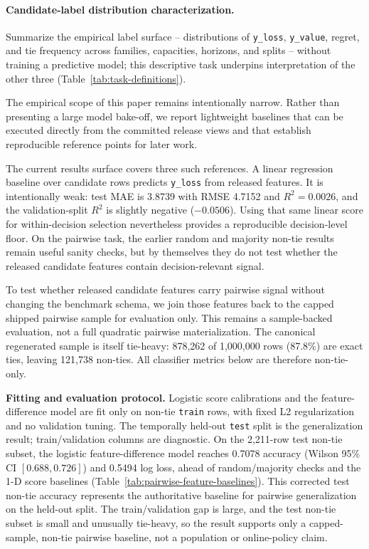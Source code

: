 \paragraph{Candidate-label distribution characterization.}
Summarize the empirical label surface -- distributions of \texttt{y\_loss}, \texttt{y\_value}, regret, and tie frequency across families, capacities, horizons, and splits -- without training a predictive model; this descriptive task underpins interpretation of the other three (Table~\ref{tab:task-definitions}).

The empirical scope of this paper remains intentionally narrow. Rather than presenting a large model bake-off, we report lightweight baselines that can be executed directly from the committed release views and that establish reproducible reference points for later work.

\begin{sloppypar}
The current results surface covers three such references. A linear regression baseline over candidate rows predicts \texttt{y\_loss} from released features. It is intentionally weak: test MAE is 3.8739 with RMSE 4.7152 and $R^2=0.0026$, and the validation-split $R^2$ is slightly negative ($-0.0506$). Using that same linear score for within-decision selection nevertheless provides a reproducible decision-level floor. On the pairwise task, the earlier random and majority non-tie results remain useful sanity checks, but by themselves they do not test whether the released candidate features contain decision-relevant signal.
\end{sloppypar}

To test whether released candidate features carry pairwise signal without
changing the benchmark schema, we join those features back to the capped
shipped pairwise sample for evaluation only. This remains a sample-backed
evaluation, not a full quadratic pairwise materialization. The canonical
regenerated sample is itself tie-heavy: 878,262 of 1,000,000 rows (87.8\%)
are exact ties, leaving 121,738 non-ties. All classifier metrics below are
therefore non-tie-only.

\textbf{Fitting and evaluation protocol.} Logistic score calibrations and
the feature-difference model are fit only on non-tie \texttt{train} rows,
with fixed L2 regularization and no validation tuning. The temporally
held-out \texttt{test} split is the generalization result; train/validation
columns are diagnostic. On the 2,211-row test non-tie subset, the logistic
feature-difference model reaches 0.7078 accuracy (Wilson 95\% CI
$[0.688, 0.726]$) and 0.5494 log loss,
ahead of random/majority checks and the 1-D score baselines
(Table~\ref{tab:pairwise-feature-baselines}). This corrected test
non-tie accuracy represents the authoritative baseline for pairwise
generalization on the held-out split. The train/validation
gap is large, and the test non-tie subset is small and unusually tie-heavy,
so the result supports only a capped-sample, non-tie pairwise baseline,
not a population or online-policy claim.


